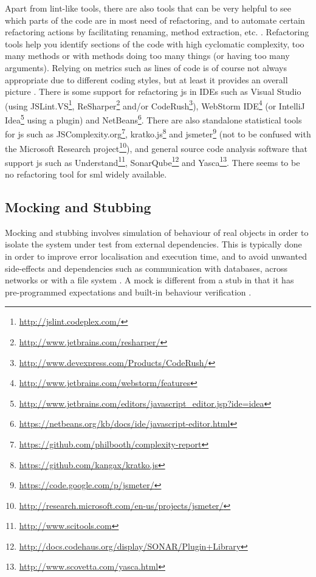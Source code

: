 \documentclass[11pt]{article}
\begin{document}
Apart from lint-like tools, there are also tools that can be very helpful to see which parts of the code are in most need of refactoring, and to automate certain refactoring actions by facilitating renaming, method extraction, etc. \cite[ch.~5]{Legacy}. Refactoring tools help you identify sections of the code with high cyclomatic complexity, too many methods or with methods doing too many things (or having too many arguments). Relying on metrics such as lines of code is of course not always appropriate due to different coding styles, but at least it provides an overall picture \cite{Kratko}. There is some support for refactoring \gls{js} in IDEs such as Visual Studio (using
JSLint.VS\footnote{\url{http://jslint.codeplex.com/}},
ReSharper\footnote{\url{http://www.jetbrains.com/resharper/}} and/or
CodeRush\footnote{\url{http://www.devexpress.com/Products/CodeRush/}}),
WebStorm IDE\footnote{\url{http://www.jetbrains.com/webstorm/features}} (or
IntelliJ Idea\footnote{\url{http://www.jetbrains.com/editors/javascript_editor.jsp?ide=idea}} using a plugin) and
NetBeans\footnote{\url{https://netbeans.org/kb/docs/ide/javascript-editor.html}}. There are also standalone statistical tools for \gls{js} such as
JSComplexity.org\footnote{\url{https://github.com/philbooth/complexity-report}},
kratko.js\footnote{\url{https://github.com/kangax/kratko.js}} and
jsmeter\footnote{\url{https://code.google.com/p/jsmeter/}} (not to be confused with the
Microsoft Research project\footnote{\url{http://research.microsoft.com/en-us/projects/jsmeter/}}), and general source code analysis software that support \gls{js} such as
Understand\footnote{\url{http://www.scitools.com}},
SonarQube\footnote{\url{http://docs.codehaus.org/display/SONAR/Plugin+Library}} and
Yasca\footnote{\url{http://www.scovetta.com/yasca.html}}.
There seems to be no refactoring tool for \gls{sml} widely available.

\subsection{Mocking and Stubbing}
\label{subsec:mocking}

Mocking and stubbing involves simulation of behaviour of real objects in order to isolate the system under test from external dependencies. This is typically done in order to improve error localisation and execution time, and to avoid unwanted side-effects and dependencies such as communication with databases, across networks or with a file system \cite[ch.~2]{Legacy}. A mock is different from a stub in that it has pre-programmed expectations and built-in behaviour verification \cite[p.~453]{Tddjs}.
\end{document}
